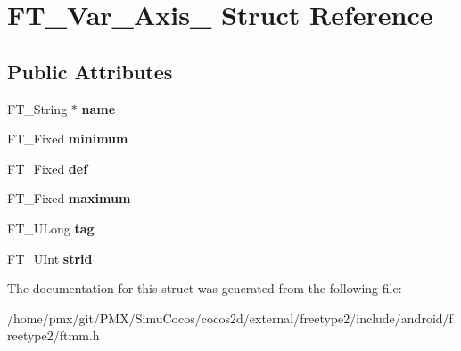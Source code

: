 \hypertarget{structFT__Var__Axis__}{}\section{F\+T\+\_\+\+Var\+\_\+\+Axis\+\_\+ Struct Reference}
\label{structFT__Var__Axis__}
\subsection*{Public Attributes}
\begin{DoxyCompactItemize}
\item 
\mbox{\label{structFT__Var__Axis___a582031c93e18eb15a0fb75905c493f03}} 
F\+T\+\_\+\+String $\ast$ {\bfseries name}
\item 
\mbox{\label{structFT__Var__Axis___aae13a8dea1c96bc3949019e8117e7edb}} 
F\+T\+\_\+\+Fixed {\bfseries minimum}
\item 
\mbox{\label{structFT__Var__Axis___a37a6ca4188a6bfd95d9d06538bf1a3dd}} 
F\+T\+\_\+\+Fixed {\bfseries def}
\item 
\mbox{\label{structFT__Var__Axis___a5704641439e9f318cf3c2b73864e3260}} 
F\+T\+\_\+\+Fixed {\bfseries maximum}
\item 
\mbox{\label{structFT__Var__Axis___a01ef9396e34e740c2d2b8c7117094624}} 
F\+T\+\_\+\+U\+Long {\bfseries tag}
\item 
\mbox{\label{structFT__Var__Axis___a297d28ab0f5666e56d7575249ccc75d7}} 
F\+T\+\_\+\+U\+Int {\bfseries strid}
\end{DoxyCompactItemize}


The documentation for this struct was generated from the following file\+:\begin{DoxyCompactItemize}
\item 
/home/pmx/git/\+P\+M\+X/\+Simu\+Cocos/cocos2d/external/freetype2/include/android/freetype2/ftmm.\+h\end{DoxyCompactItemize}

